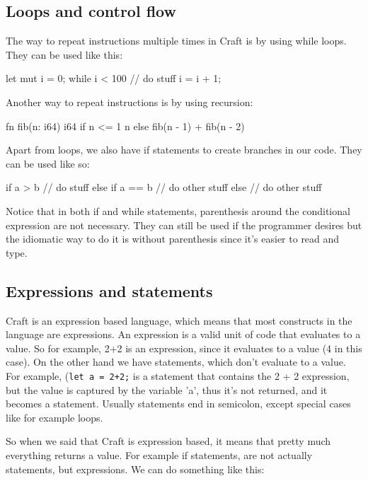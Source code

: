 ﻿\documentclass[10pt,a4paper,twocolumn,twoside]{article}
\begin{document}
\subsection{Loops and control flow}
The way to repeat instructions multiple times in Craft is by using while loops.
They can be used like this:
\begin{code}
    let mut i = 0;
    while i < 100 {
        // do stuff
        i = i + 1;
    }
\end{code}

Another way to repeat instructions is by using recursion:
\begin{code}
fn fib(n: i64) i64 {
    if n <= 1 {
        n
    } else {
        fib(n - 1) + fib(n - 2)
    }
}
\end{code}

Apart from loops, we also have if statements to create branches in our code. 
They can be used like so:

\begin{code}
    if a > b {
        // do stuff
    } else if a == b {
        // do other stuff
    } else {
        // do other stuff
    }
\end{code}

Notice that in both if and while statements, parenthesis around the conditional 
expression are not necessary. They can still be used if the programmer desires
but the idiomatic way to do it is without parenthesis since it's easier to read 
and type.

\subsection{Expressions and statements}
Craft is an expression based language, which means that most constructs in the
language are expressions. An expression is a valid unit of code that evaluates
to a value. So for example, 2+2 is an expression, since it evaluates to a value
(4 in this case). On the other hand we have statements, which don't evaluate to
a value. For example, (\texttt{let a = 2+2;} is a statement that contains the 2
+ 2 expression, but the value is captured by the variable 'a', thus it's not
returned, and it becomes a statement. Usually statements end in semicolon,
except special cases like for example loops.

So when we said that Craft is expression based, it means that pretty much
everything returns a value. For example if statements, are not actually
statements, but expressions. We can do something like this:
\end{document}
